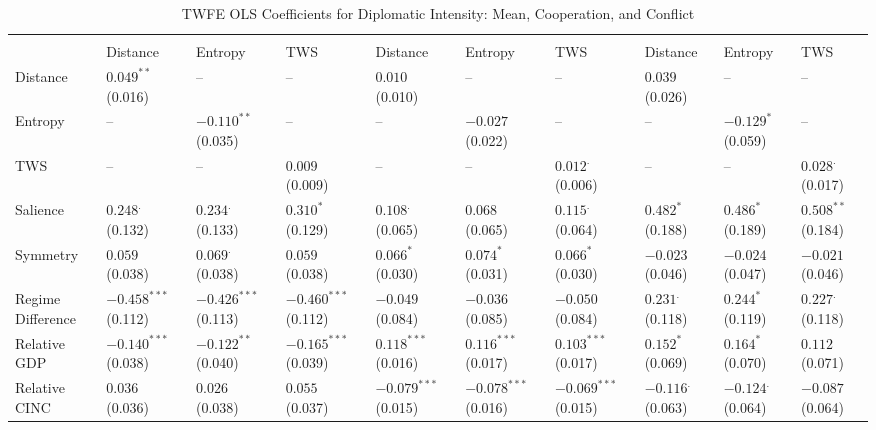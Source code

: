 \documentclass[12pt]{article}
\begin{document}
\begin{table}[htbp]\scriptsize
\centering
\caption{TWFE OLS Coefficients for Diplomatic Intensity: Mean, Cooperation, and Conflict}
\renewcommand{\arraystretch}{1.2}
\begin{tabularx}{\textwidth}{
  l
  >{\centering\arraybackslash}X >{\centering\arraybackslash}X >{\centering\arraybackslash}X
  >{\centering\arraybackslash}X >{\centering\arraybackslash}X >{\centering\arraybackslash}X
  >{\centering\arraybackslash}X >{\centering\arraybackslash}X >{\centering\arraybackslash}X
}
\toprule
\rowcolor{gray!20}
 & \multicolumn{3}{c}{\textbf{Mean}} 
 & \multicolumn{3}{c}{\textbf{Cooperation}} 
 & \multicolumn{3}{c}{\textbf{Conflict}} \\
\cmidrule(lr){2-4} \cmidrule(lr){5-7} \cmidrule(lr){8-10}
 & Distance & Entropy & TWS & Distance & Entropy & TWS & Distance & Entropy & TWS \\
\midrule
Distance & $0.049^{**}$ (0.016) & -- & -- & $0.010^{}$ (0.010) & -- & -- & $0.039^{}$ (0.026) & -- & -- \\
Entropy & -- & $-0.110^{**}$ (0.035) & -- & -- & $-0.027^{}$ (0.022) & -- & -- & $-0.129^{*}$ (0.059) & -- \\
TWS & -- & -- & $0.009^{}$ (0.009) & -- & -- & $0.012^{.}$ (0.006) & -- & -- & $0.028^{.}$ (0.017) \\
Salience & $0.248^{.}$ (0.132) & $0.234^{.}$ (0.133) & $0.310^{*}$ (0.129) & $0.108^{.}$ (0.065) & $0.068^{}$ (0.065) & $0.115^{.}$ (0.064) & $0.482^{*}$ (0.188) & $0.486^{*}$ (0.189) & $0.508^{**}$ (0.184) \\
Symmetry & $0.059^{}$ (0.038) & $0.069^{.}$ (0.038) & $0.059^{}$ (0.038) & $0.066^{*}$ (0.030) & $0.074^{*}$ (0.031) & $0.066^{*}$ (0.030) & $-0.023^{}$ (0.046) & $-0.024^{}$ (0.047) & $-0.021^{}$ (0.046) \\
Regime Difference & $-0.458^{***}$ (0.112) & $-0.426^{***}$ (0.113) & $-0.460^{***}$ (0.112) & $-0.049^{}$ (0.084) & $-0.036^{}$ (0.085) & $-0.050^{}$ (0.084) & $0.231^{.}$ (0.118) & $0.244^{*}$ (0.119) & $0.227^{.}$ (0.118) \\
Relative GDP & $-0.140^{***}$ (0.038) & $-0.122^{**}$ (0.040) & $-0.165^{***}$ (0.039) & $0.118^{***}$ (0.016) & $0.116^{***}$ (0.017) & $0.103^{***}$ (0.017) & $0.152^{*}$ (0.069) & $0.164^{*}$ (0.070) & $0.112^{}$ (0.071) \\
Relative CINC & $0.036^{}$ (0.036) & $0.026^{}$ (0.038) & $0.055^{}$ (0.037) & $-0.079^{***}$ (0.015) & $-0.078^{***}$ (0.016) & $-0.069^{***}$ (0.015) & $-0.116^{.}$ (0.063) & $-0.124^{.}$ (0.064) & $-0.087^{}$ (0.064) \\

\end{tabularx}
\end{table}
\end{document}
